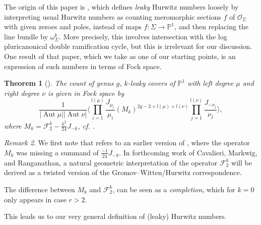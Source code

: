 \documentclass[10pt,a4paper,oneside,no-math,reqno]{amsart}%
\theoremstyle{plain}
\newtheorem{theorem}{Theorem}[section]
\theoremstyle{definition}
\theoremstyle{remark}
\newtheorem{remark}[theorem]{Remark}
\numberwithin{equation}{section}
\newcommand{\mb}[1]{\mathbb{#1}}
\newcommand{\mc}[1]{\mathcal{#1}}
\newcommand{\1}{\mathds{1}}
\renewcommand{\P}{\mb{P}}
\newcommand{\<}{\langle}
\renewcommand{\>}{\rangle}
\DeclareMathOperator{\Aut}{Aut}
\begin{document}
The origin of this paper is \cite{CMR25}, which defines \emph{leaky} Hurwitz numbers loosely by interpreting usual Hurwitz numbers as counting meromorphic sections $ f $ of $ \mc{O}_{\Sigma} $ with given zeroes and poles, instead of maps $ f \colon \Sigma \to \P^1$, and then replacing the line bundle by $ \omega_{\Sigma}^k $. More precisely, this involves intersection with the log pluricanonical double ramification cycle, but this is irrelevant for our discussion. One result of that paper, which we take as one of our starting points, is an expression of such numbers in terms of Fock space.


\begin{theorem}[{\cite[Theorem 5.2.2]{CMR25}}]\label{CMRFockSpace}
    The count of genus $g$, $k$-leaky covers of $ \P^1$ with left degree $ \mu$ and right degree $ \nu$ is given in Fock space by
    \begin{equation}
        \frac{1}{| \Aut \mu| | \Aut \nu| } \Big\< \prod_{i = 1}^{l (\mu)} \frac{J_{\mu_i}}{\mu_i} (M_k)^{2g-2+l(\mu) + l(\nu)} \prod_{j = 1}^{l(\nu)} \frac{J_{-\nu_j}}{\nu_j} \Big\>,
    \end{equation}
    where $ M_k = \mc{F}_2^k - \frac{k^2}{24} J_{-k}$, cf. \cite[Section 4]{AKL25}.
\end{theorem}

\begin{remark}
	We first note that  \cite[Section 4]{AKL25} refers to an earlier version of \cite{CMR25}, where the operator $M_k$ was missing a summand of $\frac{-1}{24}J_{-k}$. In forthcoming work of Cavalieri, Markwig, and Ranganathan, a natural geometric interpretation of the operator $\mc{F}_2^k$ will be derived as a twisted version of the Gromov--Witten/Hurwitz correspondence.
\end{remark}

The difference between $ M_k $ and $ \mc{F}_2^k$, can be seen as a \emph{completion}, which for $ k =0$ only appears in case $ r > 2$.

This leads us to our very general definition of (leaky) Hurwitz numbers.
\end{document}
